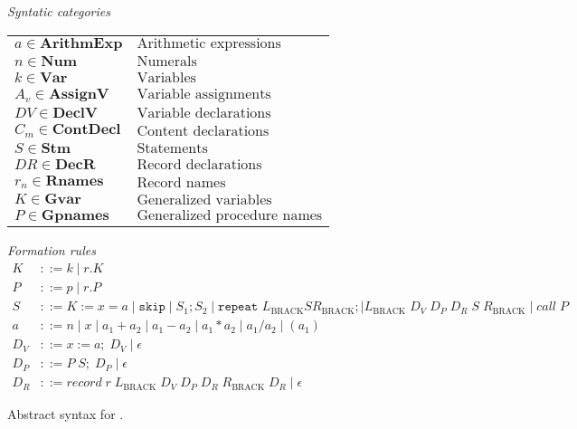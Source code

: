 \begin{figure}[h]
	\centering
	\textit{Syntatic categories}
	\vspace{4mm}


	\begin{tabular}{l l}
		$a \in \textbf{ArithmExp}$ & $\text{Arithmetic expressions}$ \\ 
		$n \in \textbf{Num}$ & $\text{Numerals}$ \\
		$k \in \textbf{Var}$ & $\text{Variables}$ \\
		$A_v \in \textbf{AssignV}$ & $\text{Variable assignments}$ \\
		$DV \in \textbf{DeclV}$ & $\text{Variable declarations}$ \\
		$C_m \in \textbf{ContDecl}$ & $\text{Content declarations}$ \\
		$S \in \textbf{Stm}$ & $\text{Statements}$\\
		$DR \in \textbf{DecR}$ & $\text{Record declarations}$\\
		$r_n \in \textbf{Rnames}$ & $\text{Record names}$ \\
		$K \in \textbf{Gvar}$ & $\text{Generalized variables}$\\
		$P \in \textbf{Gpnames}$ & $\text{Generalized procedure names}$
	\end{tabular}

	\vspace{4mm}
	\textit{Formation rules}
	\begin{align*}
		K&::=k\mid r.K \\
		P&::=p\mid r.P \\
		S&::=K:=x=a\mid \texttt{skip}\mid S_1;S_2\mid \texttt{repeat }L_\text{BRACK} S R_\text{BRACK}; \mid L_\text{BRACK} \; D_V \; D_P \; D_R \; S \; R_\text{BRACK}\mid call \; P\\
		a&::=n\mid x\mid a_1+a_2\mid a_1-a_2\mid a_1*a_2\mid a_1/a_2\mid (a_1) \\
		D_V&::= x:=a; \; D_V \mid \epsilon \\
		D_P&::= P \; S; \; D_P \mid \epsilon \\
		D_R&::= record \; r \; L_\text{BRACK} \; D_V \; D_P \; D_R \; R_\text{BRACK} \; D_R \mid \epsilon
	\end{align*}

	\caption{Abstract syntax for \dazel{}.}
	\label{fig:AbstractSyntax}
\end{figure}

